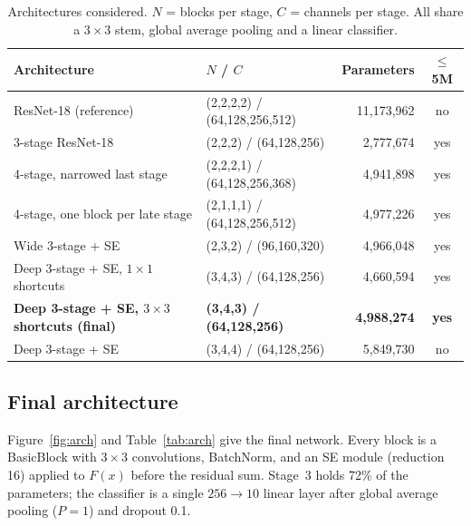\documentclass[11pt]{article}
\begin{document}
\begin{table}[t]
\centering\small
\caption{Architectures considered. $N$ = blocks per stage, $C$ = channels per stage. All share a $3\times3$ stem, global average pooling and a linear classifier.}
\label{tab:space}
\begin{tabular}{llrc}
\toprule
Architecture & $N$ / $C$ & Parameters & $\le$5M \\
\midrule
ResNet-18 (reference) & (2,2,2,2) / (64,128,256,512) & 11,173,962 & no \\
3-stage ResNet-18 & (2,2,2) / (64,128,256) & 2,777,674 & yes \\
4-stage, narrowed last stage & (2,2,2,1) / (64,128,256,368) & 4,941,898 & yes \\
4-stage, one block per late stage & (2,1,1,1) / (64,128,256,512) & 4,977,226 & yes \\
Wide 3-stage + SE & (2,3,2) / (96,160,320) & 4,966,048 & yes \\
Deep 3-stage + SE, $1\times1$ shortcuts & (3,4,3) / (64,128,256) & 4,660,594 & yes \\
\textbf{Deep 3-stage + SE, $3\times3$ shortcuts (final)} & \textbf{(3,4,3) / (64,128,256)} & \textbf{4,988,274} & \textbf{yes} \\
Deep 3-stage + SE & (3,4,4) / (64,128,256) & 5,849,730 & no \\
\bottomrule
\end{tabular}
\end{table}

\subsection{Final architecture}
Figure~\ref{fig:arch} and Table~\ref{tab:arch} give the final network. Every block is a BasicBlock with $3\times3$ convolutions, BatchNorm, and an SE module (reduction 16) applied to $F(x)$ before the residual sum. Stage~3 holds 72\% of the parameters; the classifier is a single $256\to10$ linear layer after global average pooling ($P=1$) and dropout 0.1.
\end{document}
